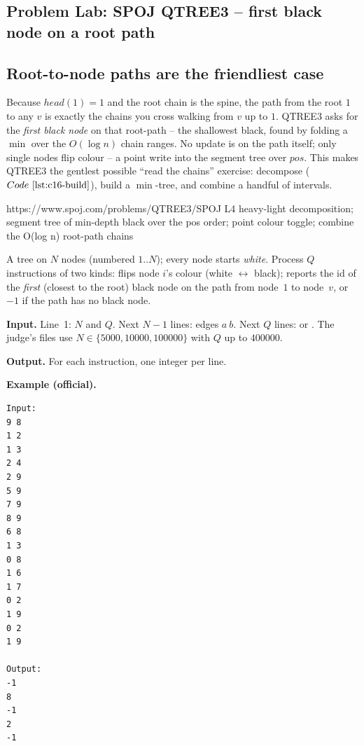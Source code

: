 \subsection{Problem Lab: SPOJ QTREE3 -- first black node on a root path}

\subsection*{Root-to-node paths are the friendliest case}
Because \(\mathit{head}(1)=1\) and the root chain is the spine, the path from the root \(1\) to any \(v\) is exactly the chains you cross walking from \(v\) up to \(1\).  QTREE3 asks for the \emph{first black node} on that root-path -- the shallowest black, found by folding a \(\min\) over the \(O(\log n)\) chain ranges.  No update is on the path itself; only single nodes flip colour -- a point write into the segment tree over \(\mathit{pos}\).  This makes QTREE3 the gentlest possible ``read the chains'' exercise: decompose (\(\coderef{c16-build}\)), build a \(\min\)-tree, and combine a handful of intervals.

  {https://www.spoj.com/problems/QTREE3/}{SPOJ L4}
  {heavy-light decomposition; segment tree of min-depth black over the pos order; point colour toggle; combine the O(log n) root-path chains}

\begin{problemstatement}
A tree on \(N\) nodes (numbered \(1..N\)); every node starts \emph{white}.  Process \(Q\) instructions of two kinds:  flips node \(i\)'s colour (white \(\leftrightarrow\) black);  reports the id of the \emph{first} (closest to the root) black node on the path from node~\(1\) to node~\(v\), or \(-1\) if the path has no black node.

\textbf{Input.} Line~1: \(N\) and \(Q\).  Next \(N-1\) lines: edges \(a\ b\).  Next \(Q\) lines:  or .  The judge's files use \(N\in\{5000,10000,100000\}\) with \(Q\) up to \(400000\).

\textbf{Output.} For each  instruction, one integer per line.

\textbf{Example (official).}
\begin{verbatim}
Input:
9 8
1 2
1 3
2 4
2 9
5 9
7 9
8 9
6 8
1 3
0 8
1 6
1 7
0 2
1 9
0 2
1 9

Output:
-1
8
-1
2
-1
\end{verbatim}
\end{problemstatement}

